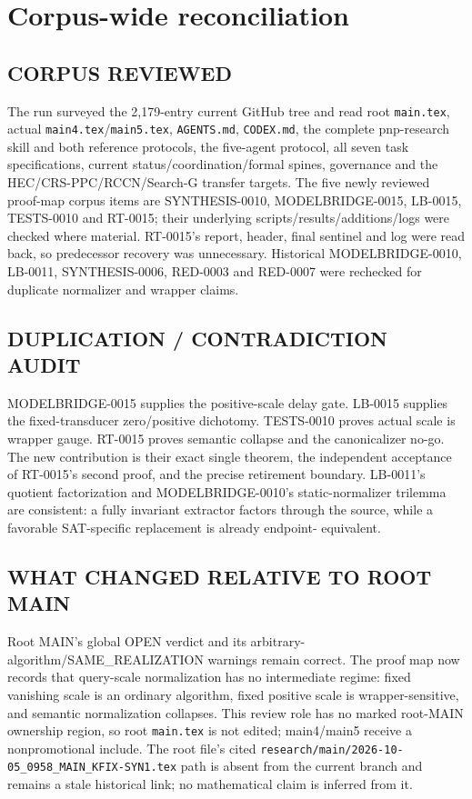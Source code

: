\documentclass[11pt]{article}
\begin{document}
\section{Corpus-wide reconciliation}

\subsection*{CORPUS REVIEWED}
The run surveyed the 2,179-entry current GitHub tree and read root
\texttt{main.tex}, actual \texttt{main4.tex}/\texttt{main5.tex},
\texttt{AGENTS.md}, \texttt{CODEX.md}, the complete pnp-research skill and
both reference protocols, the five-agent protocol, all seven task
specifications, current status/coordination/formal spines, governance and the
HEC/CRS-PPC/RCCN/Search-G transfer targets.  The five newly reviewed
proof-map corpus items are SYNTHESIS-0010, MODELBRIDGE-0015, LB-0015,
TESTS-0010 and RT-0015; their underlying scripts/results/additions/logs were
checked where material.  RT-0015's report, header, final sentinel and log
were read back, so predecessor recovery was unnecessary.  Historical
MODELBRIDGE-0010, LB-0011, SYNTHESIS-0006, RED-0003 and RED-0007 were
rechecked for duplicate normalizer and wrapper claims.

\subsection*{DUPLICATION / CONTRADICTION AUDIT}
MODELBRIDGE-0015 supplies the positive-scale delay gate.  LB-0015 supplies
the fixed-transducer zero/positive dichotomy.  TESTS-0010 proves actual scale
is wrapper gauge.  RT-0015 proves semantic collapse and the canonicalizer
no-go.  The new contribution is their exact single theorem, the independent
acceptance of RT-0015's second proof, and the precise retirement boundary.
LB-0011's quotient factorization and MODELBRIDGE-0010's static-normalizer
trilemma are consistent: a fully invariant extractor factors through the
source, while a favorable SAT-specific replacement is already endpoint-
equivalent.

\subsection*{WHAT CHANGED RELATIVE TO ROOT MAIN}
Root MAIN's global OPEN verdict and its arbitrary-algorithm/SAME\_REALIZATION
warnings remain correct.  The proof map now records that query-scale
normalization has no intermediate regime: fixed vanishing scale is an
ordinary algorithm, fixed positive scale is wrapper-sensitive, and semantic
normalization collapses.  This review role has no marked root-MAIN ownership
region, so root \texttt{main.tex} is not edited; main4/main5 receive a
nonpromotional include.  The root file's cited
\texttt{research/main/2026-10-05\_0958\_MAIN\_KFIX-SYN1.tex} path is absent
from the current branch and remains a stale historical link; no mathematical
claim is inferred from it.
\end{document}
